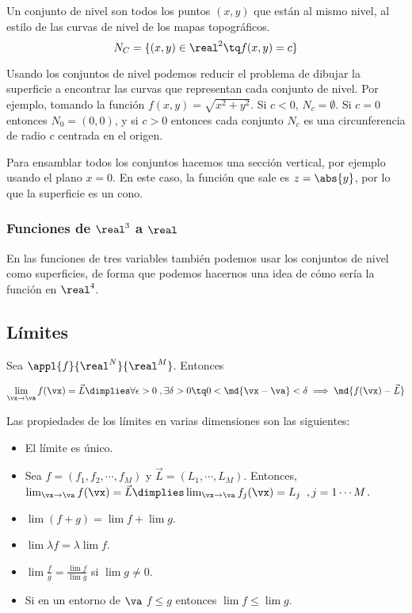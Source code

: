 \documentclass[12pt,a4paper,titlepage]{apuntes}
\begin{document}
\begin{defn} Un conjunto de nivel son todos los puntos $(x,y)$ que están al mismo nivel, al estilo de las curvas de nivel de los mapas topográficos.
\[ N_C=\{ (x,y) \in \real^2 \tq f(x,y) = c \} \]
\end{defn}

Usando los conjuntos de nivel podemos reducir el problema de dibujar la superficie a encontrar las curvas que representan cada conjunto de nivel. Por ejemplo, tomando la función $f(x,y) = \sqrt{x^2+y^2}$. Si $c<0$, $N_c = \emptyset$. Si $c = 0$ entonces $N_0 = (0,0)$, y si $c>0$ entonces cada conjunto $N_c$ es una circunferencia de radio $c$ centrada en el origen.

Para ensamblar todos los conjuntos hacemos una sección vertical, por ejemplo usando el plano $x=0$. En este caso, la función que sale es $z=\abs{y}$, por lo que la superficie es un cono.


\subsubsection{Funciones de $\real^3$ a $\real$}

En las funciones de tres variables también podemos usar los conjuntos de nivel como superficies, de forma que podemos hacernos una idea de cómo sería la función en $\real^4$.

\subsection{Límites}
\begin{defn}Sea $\appl{f}{\real^N}{\real^M}$. Entonces

\[ \lim_{\vx\to\va} f(\vx) = \vec{L} \dimplies \forall \epsilon >0\; , \exists \delta > 0 \tq 0<\md{\vx-\va} < \delta \implies \md{f(\vx ) - \vec{L}} \]

\end{defn}


Las propiedades de los límites en varias dimensiones son las siguientes:

\begin{itemize}
\item El límite es único.
\item Sea $f=(f_1, f_2,\cdots, f_M)$ y $\vec{L} = (L_1, \cdots, L_M)$. Entonces, $\lim_{\vx\to\va} f(\vx) = \vec{L} \dimplies \lim_{\vx\to\va} f_j(\vx) = L_j\;\; , j=1\cdots M$.
\item $\lim (f+g) = \lim f +\lim g$.
\item $\lim \lambda f = \lambda \lim f$.
\item $\lim \frac{f}{g} = \frac{\lim f}{\lim g}$ si $\lim g \neq 0$.
\item Si en un entorno de $\va$ $f\leq g$ entonces $\lim f \leq \lim g$.
\end{itemize}
\end{document}

